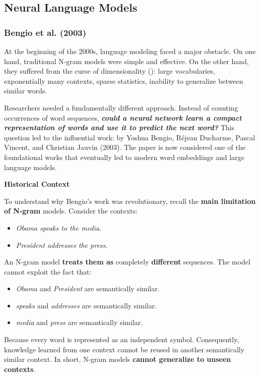\subsection{Neural Language Models}\label{sec:neural-language-models}

\subsubsection{Bengio et al. (2003)}\label{sec:bengio-et-al-2003}

At the beginning of the 2000s, language modeling faced a major obstacle. On one hand, traditional N-gram models were simple and effective. On the other hand, they suffered from the curse of dimensionality (): large vocabularies, exponentially many contexts, sparse statistics, inability to generalize between similar words.

\highspace
Researchers needed a fundamentally different approach. Instead of counting occurrences of word sequences, \textbf{\emph{could a neural network learn a compact representation of words and use it to predict the next word?}} This question led to the influential work:  by Yoshua Bengio, Réjean Ducharme, Pascal Vincent, and Christian Jauvin (2003).\cite{bengio2003neural} The paper is now considered one of the foundational works that eventually led to modern word embeddings and large language models.

\highspace
\begin{flushleft}
    \textcolor{Green3}{ \textbf{Historical Context}}
\end{flushleft}
To understand why Bengio's work was revolutionary, recall the \textbf{main limitation of N-gram} models. Consider the contexts:
\begin{itemize}
    \item \emph{Obama speaks to the media.}
    \item \emph{President addresses the press.}
\end{itemize}
An N-gram model \textbf{treats them as} completely \textbf{different} sequences. The model cannot exploit the fact that:
\begin{itemize}
    \item \emph{Obama} and \emph{President} are semantically similar.
    \item \emph{speaks} and \emph{addresses} are semantically similar.
    \item \emph{media} and \emph{press} are semantically similar.
\end{itemize}
Because every word is represented as an independent symbol. Consequently, knowledge learned from one context cannot be reused in another semantically similar context. In short, N-gram models \textbf{cannot generalize to unseen contexts}.

